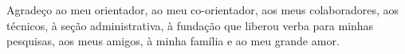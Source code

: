 \newpage

\label{agradecimentos}

\doublespacing

Agradeço ao meu orientador, ao meu co-orientador, aos meus colaboradores, aos técnicos, à seção administrativa, à fundação que liberou verba para minhas pesquisas, aos meus amigos, à minha família e ao meu grande amor.
